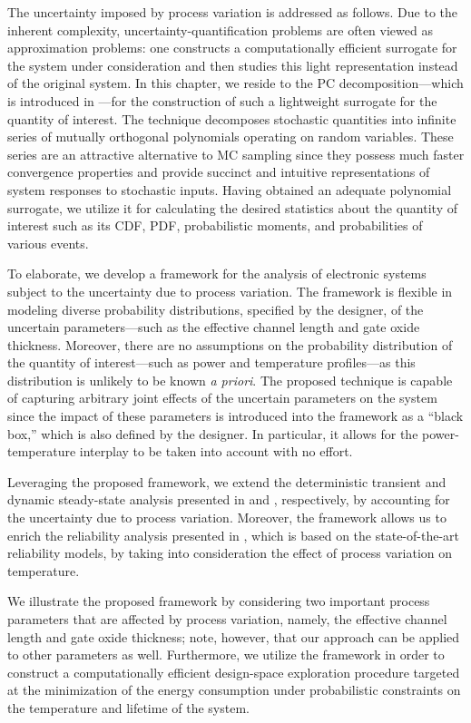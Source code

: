 The uncertainty imposed by process variation is addressed as follows. Due to the
inherent complexity, uncertainty-quantification problems are often viewed as
approximation problems: one constructs a computationally efficient surrogate for
the system under consideration and then studies this light representation
instead of the original system. In this chapter, we reside to the \acf{PC}
decomposition---which is introduced in ---for the
construction of such a lightweight surrogate for the quantity of interest. The
technique decomposes stochastic quantities into infinite series of mutually
orthogonal polynomials operating on random variables. These series are an
attractive alternative to \ac{MC} sampling since they possess much faster
convergence properties and provide succinct and intuitive representations of
system responses to stochastic inputs. Having obtained an adequate polynomial
surrogate, we utilize it for calculating the desired statistics about the
quantity of interest such as its \acf{CDF}, \acf{PDF}, probabilistic moments,
and probabilities of various events.

To elaborate, we develop a framework for the analysis of electronic systems
subject to the uncertainty due to process variation. The framework is flexible
in modeling diverse probability distributions, specified by the designer, of the
uncertain parameters---such as the effective channel length and gate oxide
thickness. Moreover, there are no assumptions on the probability distribution of
the quantity of interest---such as power and temperature profiles---as this
distribution is unlikely to be known \emph{a priori}. The proposed technique is
capable of capturing arbitrary joint effects of the uncertain parameters on the
system since the impact of these parameters is introduced into the framework as
a ``black box,'' which is also defined by the designer. In particular, it allows
for the power-temperature interplay to be taken into account with no effort.

Leveraging the proposed framework, we extend the deterministic transient and
dynamic steady-state analysis presented in  and
, respectively, by accounting for the
uncertainty due to process variation. Moreover, the framework allows us to
enrich the reliability analysis presented in , which
is based on the state-of-the-art reliability models, by taking into
consideration the effect of process variation on temperature.

We illustrate the proposed framework by considering two important process
parameters that are affected by process variation, namely, the effective channel
length and gate oxide thickness; note, however, that our approach can be applied
to other parameters as well. Furthermore, we utilize the framework in order to
construct a computationally efficient design-space exploration procedure
targeted at the minimization of the energy consumption under probabilistic
constraints on the temperature and lifetime of the system.
